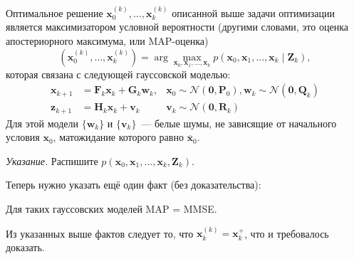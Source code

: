 \begin{theorem}
	Оптимальное решение \(\mathbf{x}_{0}^{(k)}, \ldots, \mathbf{x}_{k}^{(k)}\) 
	описанной выше задачи оптимизации является максимизатором условной 
	вероятности (другими словами, это оценка апостериорного максимума, или 
	MAP-оценка)
	\[
		(\mathbf{x}_{0}^{(k)}, \ldots, \mathbf{x}_{k}^{(k)}) = 
		\arg\max_{\mathbf{x}_{0}, \mathbf{x}_{1}, \ldots, \mathbf{x}_{k}} 
		p(\mathbf{x}_{0}, \mathbf{x}_{1}, \ldots, \mathbf{x}_{k} \mid 
		\mathbf{Z}_{k}),
	\]
	которая связана с следующей гауссовской моделью:
	\begin{align*}
		\mathbf{x}_{k + 1} &= \mathbf{F}_{k}\mathbf{x}_{k} + \mathbf{G}_{k} 
		\mathbf{w}_{k},& \mathbf{x}_{0} \sim \mathcal{N}(\mathbf{0}, 
		\mathbf{P}_{0}), \mathbf{w}_{k} \sim \mathcal{N}(\mathbf{0}, 
		\mathbf{Q}_{k}) \\
		\mathbf{z}_{k + 1} &= \mathbf{H}_{k}\mathbf{x}_{k} + \mathbf{v}_{k}&
		\mathbf{v}_{k} \sim \mathcal{N}(\mathbf{0}, 
		\mathbf{R}_{k})
	\end{align*}
	Для этой модели \(\{\mathbf{w}_{k}\}\) и \(\{\mathbf{v}_{k}\}\)~--- белые 
	шумы, не зависящие от начального условия \(\mathbf{x}_{0}\), матожидание 
	которого равно \(\overline{\mathbf{x}}_{0}\).
\end{theorem}
\noindent\textit{Указание.} Распишите \(p(\mathbf{x}_{0}, \mathbf{x}_{1}, 
\ldots, \mathbf{x}_{k}, \mathbf{Z}_{k})\).

Теперь нужно указать ещё один факт (без доказательства):
\begin{theorem}
	Для таких гауссовских моделей MAP = MMSE.
\end{theorem}

Из указанных выше фактов следует то, что \(\mathbf{x}_{k}^{(k)} = 
\mathbf{x}_{k}^{+}\), что и требовалось доказать.